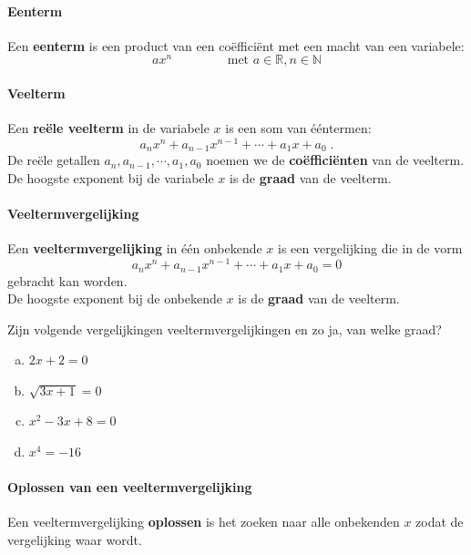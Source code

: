 \documentclass[12pt,twoside,a4paper]{article}
\begin{document}
\paragraph{Eenterm}
\begin{mdframed}
Een {\bf eenterm} is een product van een coëfficiënt met een macht van een variabele:
$$ax^n\qquad\qquad\mbox{ met }a\in\mathbb{R}, n\in\mathbb{N}$$
\end{mdframed}

\paragraph{Veelterm}
\begin{mdframed}
  Een {\bf reële veelterm} in de variabele $x$ is een som van ééntermen:
  $$ a_nx^n + a_{n-1}x^{n-1} + \cdots + a_1x + a_0 \;.$$
  De reële getallen $a_n, a_{n-1}, \cdots, a_1, a_0$ noemen we de {\bf coëfficiënten} van de veelterm.
  De hoogste exponent bij de variabele $x$ is de {\bf graad} van de veelterm.
\end{mdframed}

\paragraph{Veeltermvergelijking}
\begin{mdframed}
  Een {\bf veeltermvergelijking} in één onbekende $x$ is een vergelijking die in de vorm
  $$a_nx^n + a_{n-1}x^{n-1} + \cdots + a_1x + a_0 = 0$$
  gebracht kan worden.\\
  De hoogste exponent bij de onbekende $x$ is de {\bf graad} van de veelterm.
\end{mdframed}

\begin{oefening}
  Zijn volgende vergelijkingen veeltermvergelijkingen en zo ja, van welke graad?
  \begin{multicols}{2}
    \begin{enumerate}[(a)]
      \itemsep.5em
    \item $2x + 2 = 0$
    \item $\sqrt{3x+1} = 0$
    \item $x^2-3x+8=0$
    \item $x^4=-16$
    \end{enumerate}
  \end{multicols}
\end{oefening}

\paragraph{Oplossen van een veeltermvergelijking}
\begin{mdframed}
  Een veeltermvergelijking {\bf oplossen} is het zoeken naar alle onbekenden $x$ zodat de vergelijking waar wordt.
\end{mdframed}
\end{document}

